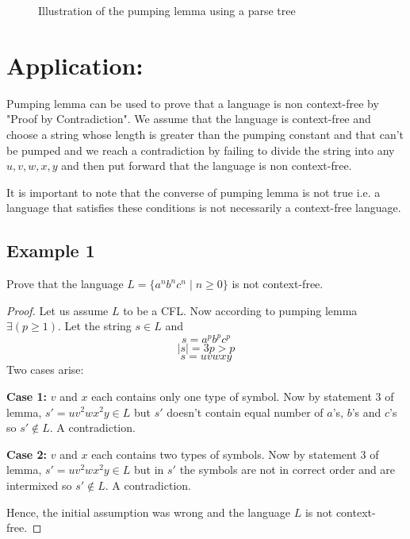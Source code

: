 \documentclass{article}
\begin{document}
\begin{figure}
  \centering 
\caption{Illustration of the pumping lemma using a parse tree}
\label{fig:my_label}
\end{figure}

\section{Application:}
Pumping lemma can be used to prove that a language is non context-free by "Proof by Contradiction". We assume that the language is context-free and choose a string whose length is greater than the pumping constant and that can't be pumped and we reach a contradiction by failing to divide the string into any $u,v,w,x,y$ and then put forward that the language is non context-free.

It is important to note that the converse of pumping lemma is not true i.e. a language that satisfies these conditions is not necessarily a context-free language.

\subsection{Example 1}

Prove that the language $L=\{a^nb^nc^n\mid n\ge 0\}$ is not context-free.

\begin{proof}
Let us assume $L$ to be a CFL. Now according to pumping lemma $\exists(p\ge1)$.
Let the string $s\in L$ and $$s=a^pb^pc^p$$ $$\mid s\mid=3p>p $$ $$s=uvwxy$$
Two cases arise:

\textbf{Case 1:} $v$ and $x$ each contains only one type of symbol.
Now by statement 3 of lemma, $s'=uv^2wx^2y\in L$ but $s'$ doesn't contain equal number of $a$'s, $b$'s and $c$'s so $s'\notin L$. A contradiction.

\textbf{Case 2:} $v$ and $x$ each contains two types of symbols.
Now by statement 3 of lemma, $s'=uv^2wx^2y\in L$ but in $s'$ the symbols are not in correct order and are intermixed so $s'\notin L$. A contradiction.

Hence, the initial assumption was wrong and the language $L$ is not context-free.
\end{proof}
\end{document}
